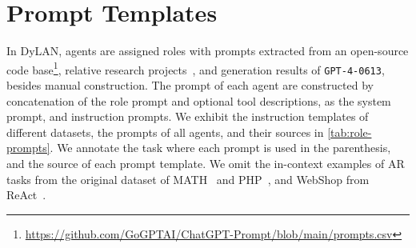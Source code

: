\documentclass{article} %
\begin{document}
\clearpage



\section{Prompt Templates} \label{app:e}

In DyLAN, agents are assigned roles with prompts extracted from an open-source code base\footnote{\url{https://github.com/GoGPTAI/ChatGPT-Prompt/blob/main/prompts.csv}}, relative research projects~\citep{debate1-mit, reflexion, PHPrompting}, and generation results of \texttt{GPT-4-0613}, besides manual construction. The prompt of each agent are constructed by concatenation of the role prompt and optional tool descriptions, as the system prompt, and instruction prompts. We exhibit the instruction templates of different datasets, the prompts of all agents, and their sources in \cref{tab:role-prompts}. We annotate the task where each prompt is used in the parenthesis, and the source of each prompt template. We omit the in-context examples of AR tasks from the original dataset of MATH~\citep{hendrycksmath2021} and PHP~\cite{PHPrompting}, and WebShop from ReAct~\citep{yao2023react}. 
\end{document}
